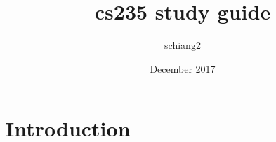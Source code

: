 \documentclass{article}
\title{cs235 study guide}
\author{schiang2 }
\date{December 2017}
\begin{document}
\maketitle

\section{Introduction}
\end{document}
